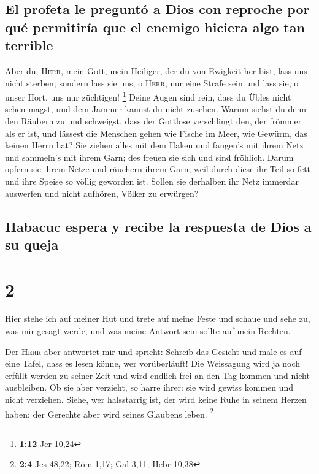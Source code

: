 \hypertarget{el-profeta-le-preguntuxf3-a-dios-con-reproche-por-quuxe9-permitiruxeda-que-el-enemigo-hiciera-algo-tan-terrible}{%
\subsection{El profeta le preguntó a Dios con reproche por qué
permitiría que el enemigo hiciera algo tan
terrible}\label{el-profeta-le-preguntuxf3-a-dios-con-reproche-por-quuxe9-permitiruxeda-que-el-enemigo-hiciera-algo-tan-terrible}}

 Aber du, \textsc{Herr}, mein Gott, mein Heiliger, der du
von Ewigkeit her bist, lass uns nicht sterben; sondern lass sie uns, o
\textsc{Herr}, nur eine Strafe sein und lass sie, o unser Hort, uns nur
züchtigen! \footnote{\textbf{1:12} Jer 10,24}  Deine
Augen sind rein, dass du Übles nicht sehen magst, und dem Jammer kannst
du nicht zusehen. Warum siehst du denn den Räubern zu und schweigst,
dass der Gottlose verschlingt den, der frömmer als er ist,
 und lässest die Menschen gehen wie Fische im Meer, wie
Gewürm, das keinen Herrn hat?  Sie ziehen alles mit dem
Haken und fangen's mit ihrem Netz und sammeln's mit ihrem Garn; des
freuen sie sich und sind fröhlich.  Darum opfern sie
ihrem Netze und räuchern ihrem Garn, weil durch diese ihr Teil so fett
und ihre Speise so völlig geworden ist.  Sollen sie
derhalben ihr Netz immerdar auswerfen und nicht aufhören, Völker zu
erwürgen?

\hypertarget{habacuc-espera-y-recibe-la-respuesta-de-dios-a-su-queja}{%
\subsection{Habacuc espera y recibe la respuesta de Dios a su
queja}\label{habacuc-espera-y-recibe-la-respuesta-de-dios-a-su-queja}}

\hypertarget{section-1}{%
\section{2}\label{section-1}}

 Hier stehe ich auf meiner Hut und trete auf meine Feste
und schaue und sehe zu, was mir gesagt werde, und was meine Antwort sein
sollte auf mein Rechten.

 Der \textsc{Herr} aber antwortet mir und spricht: Schreib
das Gesicht und male es auf eine Tafel, dass es lesen könne, wer
vorüberläuft!  Die Weissagung wird ja noch erfüllt werden
zu seiner Zeit und wird endlich frei an den Tag kommen und nicht
ausbleiben. Ob sie aber verzieht, so harre ihrer: sie wird gewiss kommen
und nicht verziehen.  Siehe, wer halsstarrig ist, der wird
keine Ruhe in seinem Herzen haben; der Gerechte aber wird seines
Glaubens leben. \footnote{\textbf{2:4} Jes 48,22; Röm 1,17; Gal 3,11;
  Hebr 10,38}

